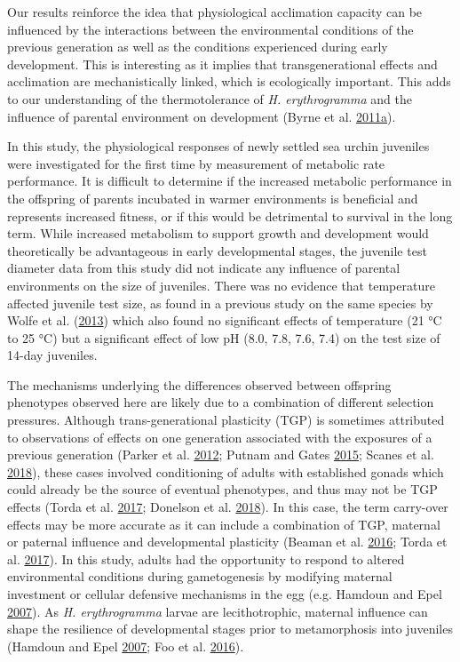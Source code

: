 \documentclass[a4paper,10pt, oneside]{memoir}
\begin{document}
Our results reinforce the idea that physiological acclimation capacity can be influenced by the interactions between the environmental conditions of the previous generation as well as the conditions experienced during early development.
This is interesting as it implies that transgenerational effects and acclimation are mechanistically linked, which is ecologically important.
This adds to our understanding of the thermotolerance of \emph{H. erythrogramma} and the influence of parental environment on development (Byrne et al. \protect\hyperlink{ref-Byrne2011}{2011}\protect\hyperlink{ref-Byrne2011}{a}).

In this study, the physiological responses of newly settled sea urchin juveniles were investigated for the first time by measurement of metabolic rate performance.
It is difficult to determine if the increased metabolic performance in the offspring of parents incubated in warmer environments is beneficial and represents increased fitness, or if this would be detrimental to survival in the long term.
While increased metabolism to support growth and development would theoretically be advantageous in early developmental stages, the juvenile test diameter data from this study did not indicate any influence of parental environments on the size of juveniles.
There was no evidence that temperature affected juvenile test size, as found in a previous study on the same species by Wolfe et al. (\protect\hyperlink{ref-Wolfe2013}{2013}) which also found no significant effects of temperature (21 °C to 25 °C) but a significant effect of low pH (8.0, 7.8, 7.6, 7.4) on the test size of 14-day juveniles.

The mechanisms underlying the differences observed between offspring phenotypes observed here are likely due to a combination of different selection pressures.
Although trans-generational plasticity (TGP) is sometimes attributed to observations of effects on one generation associated with the exposures of a previous generation (Parker et al. \protect\hyperlink{ref-Parker2012}{2012}; Putnam and Gates \protect\hyperlink{ref-Putnam2015}{2015}; Scanes et al. \protect\hyperlink{ref-Scanes2018}{2018}), these cases involved conditioning of adults with established gonads which could already be the source of eventual phenotypes, and thus may not be TGP effects (Torda et al. \protect\hyperlink{ref-Torda2017}{2017}; Donelson et al. \protect\hyperlink{ref-Donelson2018}{2018}).
In this case, the term carry-over effects may be more accurate as it can include a combination of TGP, maternal or paternal influence and developmental plasticity (Beaman et al. \protect\hyperlink{ref-Beaman2016}{2016}; Torda et al. \protect\hyperlink{ref-Torda2017}{2017}).
In this study, adults had the opportunity to respond to altered environmental conditions during gametogenesis by modifying maternal investment or cellular defensive mechanisms in the egg (e.g. Hamdoun and Epel \protect\hyperlink{ref-Hamdoun2007}{2007}).
As \emph{H. erythrogramma} larvae are lecithotrophic, maternal influence can shape the resilience of developmental stages prior to metamorphosis into juveniles (Hamdoun and Epel \protect\hyperlink{ref-Hamdoun2007}{2007}; Foo et al. \protect\hyperlink{ref-Foo2016}{2016}).
\end{document}
